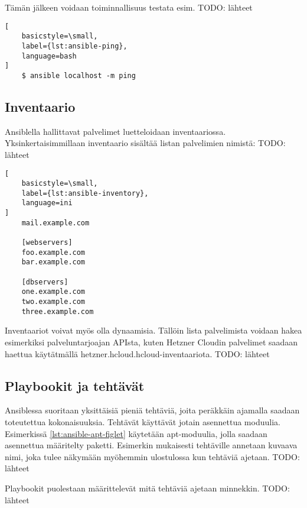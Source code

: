 Tämän jälkeen voidaan toiminnallisuus testata esim.
TODO: lähteet

\begin{lstlisting}[
    basicstyle=\small,
    label={lst:ansible-ping},
    language=bash
]
    $ ansible localhost -m ping
\end{lstlisting}

\subsection{Inventaario}

Ansiblella hallittavat palvelimet luetteloidaan inventaariossa.
Yksinkertaisimmillaan inventaario sisältää listan palvelimien nimistä:
TODO: lähteet

\begin{lstlisting}[
    basicstyle=\small,
    label={lst:ansible-inventory},
    language=ini
]
    mail.example.com

    [webservers]
    foo.example.com
    bar.example.com

    [dbservers]
    one.example.com
    two.example.com
    three.example.com
\end{lstlisting}

Inventaariot voivat myös olla dynaamisia. Tällöin lista palvelimista
voidaan hakea esimerkiksi palveluntarjoajan APIsta, kuten Hetzner Cloudin
palvelimet saadaan haettua käytätmällä hetzner.hcloud.hcloud-inventaariota.
TODO: lähteet

\subsection{Playbookit ja tehtävät}

Ansiblessa suoritaan yksittäisiä pieniä tehtäviä, joita peräkkäin ajamalla
saadaan toteutettua kokonaisuuksia. Tehtävät käyttävät jotain asennettua
moduulia. Esimerkissä \ref{lst:ansible-apt-figlet} käytetään apt-moduulia,
jolla saadaan asennettua määritelty paketti. Esimerkin mukaisesti tehtäville
annetaan kuvaava nimi, joka tulee näkymään myöhemmin ulostulossa kun
tehtäviä ajetaan.
TODO: lähteet



Playbookit puolestaan määrittelevät mitä tehtäviä ajetaan minnekkin.
TODO: lähteet



